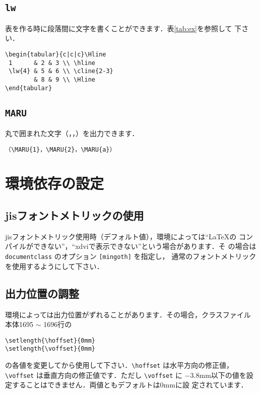 \documentclass[mingoth]{knct-paper}		%
\begin{document}
 \section{\texttt{lw}}
 表を作る時に段落間に文字を書くことができます．表\ref{tab:ex}を参照して
 下さい．
\begin{verbatim}
\begin{tabular}{c|c|c}\Hline
 1      & 2 & 3 \\ \hline
 \lw{4} & 5 & 6 \\ \cline{2-3}
        & 8 & 9 \\ \Hline
\end{tabular}
\end{verbatim}

 \section{\texttt{MARU}}
 丸で囲まれた文字（，，）を出力できます．
\begin{verbatim}
（\MARU{1}，\MARU{2}，\MARU{a}）
\end{verbatim}
 

\chapter{環境依存の設定}

 \section{jisフォントメトリックの使用}
 jisフォントメトリック使用時（デフォルト値），環境によっては``\LaTeX{}の
 コンパイルができない''，``xdviで表示できない''という場合があります．そ
 の場合は \verb|documentclass| のオプション \verb|[mingoth]| を指定し，
 通常のフォントメトリックを使用するようにして下さい．
 
 \section{出力位置の調整}
 環境によっては出力位置がずれることがあります．その場合，クラスファイル
 本体1695 $\sim$ 1696行の
\begin{verbatim}
\setlength{\hoffset}{0mm}
\setlength{\voffset}{0mm}
\end{verbatim}
 の各値を変更してから使用して下さい．\verb|\hoffset| は水平方向の修正値，
 \verb|\voffset| は垂直方向の修正値です．ただし \verb|\voffset| に
 $-3.8$mm以下の値を設定することはできません．両値ともデフォルトは0mmに設
 定されています．
\end{document}
